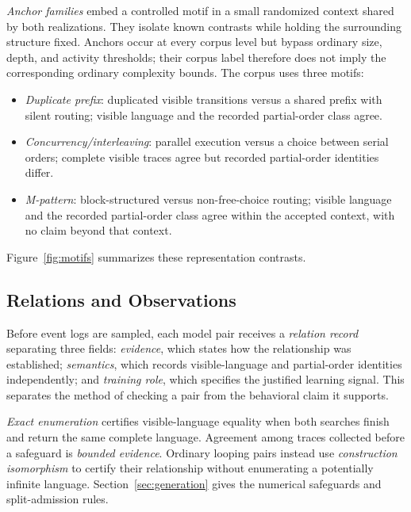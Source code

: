 \documentclass[mathematics,article,submit,moreauthors]{Definitions/mdpi}
\begin{document}
\emph{Anchor families} embed a controlled motif in a small randomized context shared by both realizations. They isolate known contrasts while holding the surrounding structure fixed. Anchors occur at every corpus level but bypass ordinary size, depth, and activity thresholds; their corpus label therefore does not imply the corresponding ordinary complexity bounds. The corpus uses three motifs:
\begin{itemize}
\item \emph{Duplicate prefix}: duplicated visible transitions versus a shared prefix with silent routing; visible language and the recorded partial-order class agree.
\item \emph{Concurrency/interleaving}: parallel execution versus a choice between serial orders; complete visible traces agree but recorded partial-order identities differ.
\item \emph{M-pattern}: block-structured versus non-free-choice routing; visible language and the recorded partial-order class agree within the accepted context, with no claim beyond that context.
\end{itemize}
Figure~\ref{fig:motifs} summarizes these representation contrasts.



\FloatBarrier

\subsection{Relations and Observations}\label{sec:relations}

Before event logs are sampled, each model pair receives a \emph{relation record} separating three fields: \emph{evidence}, which states how the relationship was established; \emph{semantics}, which records visible-language and partial-order identities independently; and \emph{training role}, which specifies the justified learning signal. This separates the method of checking a pair from the behavioral claim it supports.

\emph{Exact enumeration} certifies visible-language equality when both searches finish and return the same complete language. Agreement among traces collected before a safeguard is \emph{bounded evidence}. Ordinary looping pairs instead use \emph{construction isomorphism} to certify their relationship without enumerating a potentially infinite language. Section~\ref{sec:generation} gives the numerical safeguards and split-admission rules.
\end{document}
